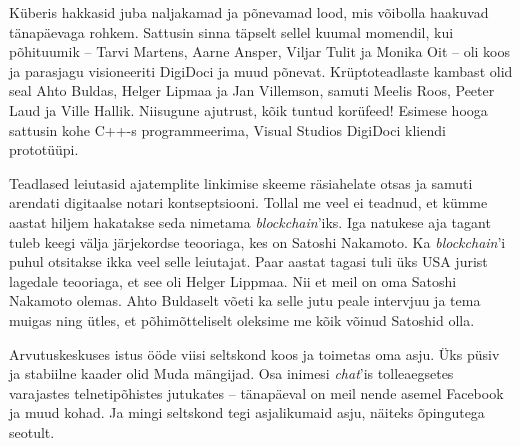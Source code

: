 Küberis hakkasid juba naljakamad ja põnevamad 
lood, mis võibolla haakuvad tänapäevaga rohkem. Sattusin 
sinna täpselt sellel kuumal momendil, kui põhituumik -- Tarvi 
Martens, Aarne Ansper, 
Viljar Tulit ja Monika Oit 
-- oli koos ja parasjagu visioneeriti DigiDoci ja muud põnevat. Krüptoteadlaste kambast olid seal Ahto 
Buldas, Helger Lipmaa ja Jan 
Villemson, samuti
Meelis Roos, Peeter Laud ja Ville Hallik. Niisugune ajutrust, kõik tuntud korüfeed! 
Esimese hooga sattusin kohe C++-s programmeerima, 
Visual Studios DigiDoci kliendi prototüüpi. 

Teadlased leiutasid ajatemplite linkimise skeeme 
räsiahelate otsas ja samuti arendati digitaalse notari kontseptsiooni. Tollal me veel ei teadnud, et kümme aastat hiljem 
hakatakse seda nimetama \emph{blockchain}'iks. Iga natukese aja tagant tuleb keegi 
välja järjekordse teooriaga, kes on Satoshi Nakamoto. Ka \emph{blockchain}'i puhul otsitakse ikka veel selle leiutajat. Paar aastat 
tagasi tuli üks USA jurist 
lagedale teooriaga, et see oli Helger Lippmaa. Nii et meil on oma 
Satoshi Nakamoto olemas. Ahto Buldaselt võeti ka 
selle jutu peale intervjuu ja tema muigas ning ütles, et põhimõtteliselt oleksime me kõik 
võinud Satoshid olla. 


Arvutuskeskuses istus ööde viisi seltskond koos 
ja toimetas oma asju. Üks püsiv ja stabiilne kaader olid 
Muda mängijad. Osa inimesi \emph{chat}'is 
tolleaegsetes varajastes telnetipõhistes jutukates -- 
tänapäeval on meil nende asemel Facebook ja muud kohad. Ja mingi seltskond tegi asjalikumaid asju, näiteks õpingutega seotult. 


